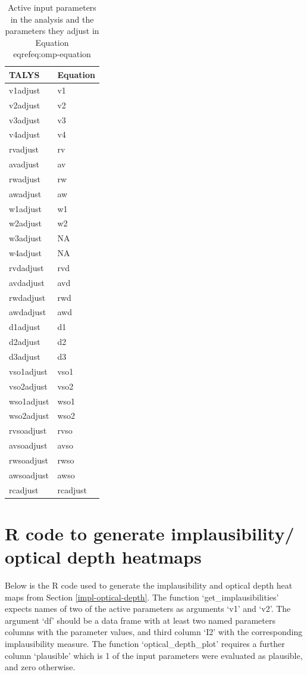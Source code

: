 \documentclass[
  12pt,
  a4paper,
  twoside]{book}
\begin{document}
\begin{table}\centering
\caption{Active input parameters in the analysis and the parameters they adjust in Equation \\eqref{eq:omp-equation}}
\label{tab:input-params}
\begin{tabular}{|l|l|}
\hline
\textbf{TALYS} & \textbf{Equation}\\
\hline
v1adjust & v1\\
v2adjust & v2\\
v3adjust & v3\\ 
v4adjust & v4\\   
rvadjust & rv\\  
avadjust & av\\   
rwadjust & rw\\   
awadjust & aw\\  
w1adjust & w1\\  
w2adjust & w2\\ 
w3adjust & NA\\   
w4adjust & NA\\   
rvdadjust & rvd\\  
avdadjust & avd\\
rwdadjust & rwd\\
awdadjust & awd\\
d1adjust & d1\\
d2adjust & d2\\
d3adjust & d3\\ 
vso1adjust & vso1\\
vso2adjust & vso2\\ 
wso1adjust & wso1\\
wso2adjust & wso2\\
rvsoadjust & rvso\\
avsoadjust & avso\\
rwsoadjust & rwso\\
awsoadjust & awso\\
rcadjust & rcadjust\\
\hline
\end{tabular}
\end{table}

\hypertarget{r-code-impl}{%
\chapter{R code to generate implausibility/ optical depth heatmaps}\label{r-code-impl}}

Below is the R code used to generate the implausibility and optical depth heat maps from Section \ref{impl-optical-depth}. The function `get\_implausibilities' expects names of two of the active parameters as arguments `v1' and `v2'. The argument `df' should be a data frame with at least two named parameters columns with the parameter values, and third column `I2' with the corresponding implausibility measure. The function `optical\_depth\_plot' requires a further column `plausible' which is 1 of the input parameters were evaluated as plausible, and zero otherwise.
\end{document}
